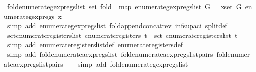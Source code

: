 \begin{isabellebody}
\endisatagproof
{\isafoldproof}%
%
\isadelimproof
\isanewline
%
\endisadelimproof
\isanewline
{}\isamarkupfalse%
\ fold{\isacharunderscore}enumerate{\isacharunderscore}gexp{\isacharunderscore}regs{\isacharunderscore}list{\isacharcolon}\ {\isachardoublequoteopen}set\ {\isacharparenleft}fold\ {\isacharparenleft}{\isacharat}{\isacharparenright}\ {\isacharparenleft}map\ enumerate{\isacharunderscore}gexp{\isacharunderscore}regs{\isacharunderscore}list\ G{\isacharparenright}\ {\isacharbrackleft}{\isacharbrackright}{\isacharparenright}\ {\isacharequal}\ {\isacharparenleft}{\isasymUnion}x{\isasymin}set\ G{\isachardot}\ enumerate{\isacharunderscore}gexp{\isacharunderscore}regs\ x{\isacharparenright}{\isachardoublequoteclose}\isanewline
%
\isadelimproof
\ \ \ \ %
\endisadelimproof
%
\isatagproof
{}\isamarkupfalse%
\ {\isacharparenleft}simp\ add{\isacharcolon}\ enumerate{\isacharunderscore}gexp{\isacharunderscore}regs{\isacharunderscore}list\ fold{\isacharunderscore}append{\isacharunderscore}concat{\isacharunderscore}rev\ inf{\isacharunderscore}sup{\isacharunderscore}aci{\isacharparenleft}{}{\isacharparenright}\ split{\isacharunderscore}def{\isacharparenright}%
\endisatagproof
{\isafoldproof}%
%
\isadelimproof
\isanewline
%
\endisadelimproof
\isanewline
{}\isamarkupfalse%
\ set{\isacharunderscore}enumerate{\isacharunderscore}registers{\isacharunderscore}list{\isacharcolon}\ {\isachardoublequoteopen}enumerate{\isacharunderscore}registers\ t\ {\isacharequal}\ set\ {\isacharparenleft}enumerate{\isacharunderscore}registers{\isacharunderscore}list\ t{\isacharparenright}{\isachardoublequoteclose}\isanewline
%
\isadelimproof
\ \ %
\endisadelimproof
%
\isatagproof
{}\isamarkupfalse%
\ {\isacharparenleft}simp\ add{\isacharcolon}\ enumerate{\isacharunderscore}registers{\isacharunderscore}list{\isacharunderscore}def\ enumerate{\isacharunderscore}registers{\isacharunderscore}def{\isacharparenright}\isanewline
\ \ \isamarkupfalse%
\ {\isacharparenleft}simp\ add{\isacharcolon}\ fold{\isacharunderscore}enumerate{\isacharunderscore}aexp{\isacharunderscore}regs{\isacharunderscore}list\ fold{\isacharunderscore}enumerate{\isacharunderscore}aexp{\isacharunderscore}regs{\isacharunderscore}list{\isacharunderscore}pairs\ fold{\isacharunderscore}enumerate{\isacharunderscore}aexp{\isacharunderscore}regs{\isacharunderscore}list{\isacharunderscore}pairs{\isacharunderscore}{}{\isacharparenright}\isanewline
\ \ \isamarkupfalse%
\ {\isacharparenleft}simp\ add{\isacharcolon}\ fold{\isacharunderscore}enumerate{\isacharunderscore}gexp{\isacharunderscore}regs{\isacharunderscore}list{\isacharparenright}\isanewline

\end{isabellebody}
